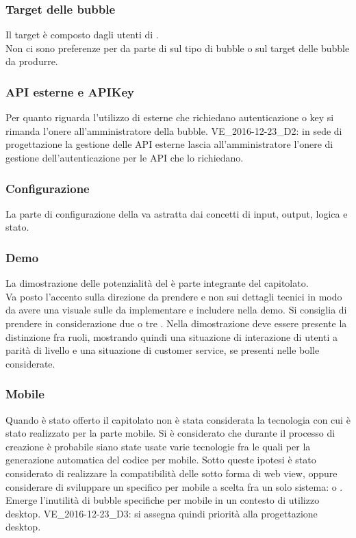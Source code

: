 \subsubsection{Target delle bubble}
Il target è composto dagli utenti di .\\
Non ci sono preferenze per da parte di \Proponente{} sul tipo di bubble o sul target delle bubble da produrre. 

\subsubsection{API esterne e APIKey}
Per quanto riguarda l'utilizzo di  esterne che richiedano autenticazione o key si rimanda l'onere all'amministratore della bubble.
VE_2016-12-23_D2: in sede di progettazione la gestione delle API esterne lascia all'amministratore l'onere di gestione dell'autenticazione per le API che lo richiedano.

\subsubsection{Configurazione}
La parte di configurazione della  va astratta dai concetti di input, output, logica e stato.

\subsubsection{Demo}
La dimostrazione delle potenzialità del  è parte integrante del capitolato.\\
Va posto l'accento sulla direzione da prendere e non sui dettagli tecnici in modo da avere una visuale sulle  da implementare e includere nella demo. Si consiglia di prendere in considerazione due o tre .
Nella dimostrazione deve essere presente la distinzione fra ruoli, mostrando quindi una situazione di interazione di utenti a parità di livello e una situazione di customer service, se presenti nelle bolle considerate. 

\subsubsection{Mobile}
Quando è stato offerto il capitolato non è stata considerata la tecnologia con cui  è stato realizzato per la parte mobile. Si è considerato che durante il processo di creazione è probabile siano state usate varie tecnologie fra le quali  per la generazione automatica del codice per mobile. Sotto queste ipotesi è stato considerato di realizzare la compatibilità delle  sotto forma di web view, oppure considerare di sviluppare un  specifico per mobile a scelta fra un solo sistema:  o .  
Emerge l'inutilità di bubble specifiche per mobile in un contesto di utilizzo desktop.
VE_2016-12-23_D3: si assegna quindi priorità alla progettazione desktop.

\clearpage
